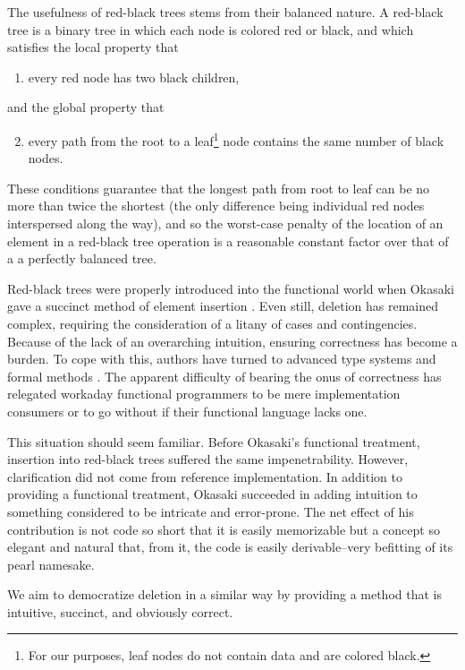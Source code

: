 \documentclass[preprint]{sigplanconf}
\begin{document}
The usefulness of red-black trees stems from their balanced nature. A red-black tree is a binary tree in which each node is colored red or black, and which satisfies the local property that
\begin{enumerate}
\item every red node has two black children,
\end{enumerate}
and the global property that
\begin{enumerate}
\setcounter{enumi}{1}
\item every path from the root to a leaf\footnote{For our purposes, leaf nodes do not contain data and are colored black.} node contains the same number of black nodes.
\end{enumerate}
These conditions guarantee that the longest path from root to leaf can be no more than twice the shortest (the only difference being individual red nodes interspersed along the way), and so the worst-case penalty of the location of an element in a red-black tree operation is a reasonable constant factor over that of a a perfectly balanced tree.

Red-black trees were properly introduced into the functional world when Okasaki gave a succinct method of element insertion \cite{okasaki1999functional}. Even still, deletion has remained complex, requiring the consideration of a litany of cases and contingencies. Because of the lack of an overarching intuition, ensuring correctness has become a burden. To cope with this, authors have turned to advanced type systems \cite{kahrs2001red} and formal methods \cite{appel2011efficient}. The apparent difficulty of bearing the onus of correctness has relegated workaday functional programmers to be mere implementation consumers or to go without if their functional language lacks one.

This situation should seem familiar. Before Okasaki's functional treatment, insertion into red-black trees suffered the same impenetrability. However, clarification did not come from reference implementation. In addition to providing a functional treatment, Okasaki succeeded in adding intuition to something considered to be intricate and error-prone. The net effect of his contribution is not code so short that it is easily memorizable but a concept so elegant and natural that, from it, the code is easily derivable--very befitting of its pearl namesake.

We aim to democratize deletion in a similar way by providing a method that is intuitive, succinct, and obviously correct.
\end{document}
